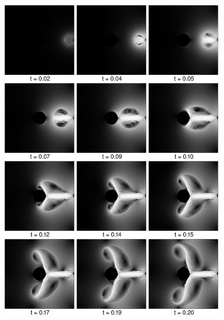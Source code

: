 \begin{figure}[htbp]
    \includegraphics[width=\textwidth]{figures/navier_stokes/navier_0.png}
    \label{fig:navier_0}
\end{figure}
